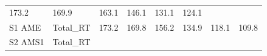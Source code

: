 \documentclass[]{article}
\begin{document}
\begin{longtable}[]{@{}llrrrrrr@{}}
\begin{minipage}[t]{0.09\columnwidth}
173.2\strut
\end{minipage} & \begin{minipage}[t]{0.09\columnwidth}\raggedleft\strut
169.9\strut
\end{minipage} & \begin{minipage}[t]{0.09\columnwidth}\raggedleft\strut
163.1\strut
\end{minipage} & \begin{minipage}[t]{0.09\columnwidth}\raggedleft\strut
146.1\strut
\end{minipage} & \begin{minipage}[t]{0.09\columnwidth}\raggedleft\strut
131.1\strut
\end{minipage} & \begin{minipage}[t]{0.09\columnwidth}\raggedleft\strut
124.1\strut
\end{minipage}\tabularnewline
\begin{minipage}[t]{0.14\columnwidth}\raggedright\strut
S1 AME\strut
\end{minipage} & \begin{minipage}[t]{0.13\columnwidth}\raggedright\strut
Total\_RT\strut
\end{minipage} & \begin{minipage}[t]{0.09\columnwidth}\raggedleft\strut
173.2\strut
\end{minipage} & \begin{minipage}[t]{0.09\columnwidth}\raggedleft\strut
169.8\strut
\end{minipage} & \begin{minipage}[t]{0.09\columnwidth}\raggedleft\strut
156.2\strut
\end{minipage} & \begin{minipage}[t]{0.09\columnwidth}\raggedleft\strut
134.9\strut
\end{minipage} & \begin{minipage}[t]{0.09\columnwidth}\raggedleft\strut
118.1\strut
\end{minipage} & \begin{minipage}[t]{0.09\columnwidth}\raggedleft\strut
109.8\strut
\end{minipage}\tabularnewline
\begin{minipage}[t]{0.14\columnwidth}\raggedright\strut
S2 AMS1\strut
\end{minipage} & \begin{minipage}[t]{0.13\columnwidth}\raggedright\strut
Total\_RT\strut
\end{minipage} & \begin{minipage}[t]{0.09\columnwidth}\raggedleft\strut

\end{minipage}
\end{longtable}
\end{document}
